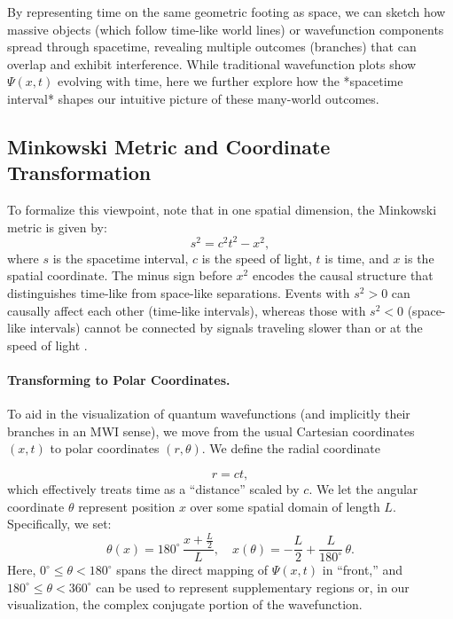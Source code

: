 \documentclass{article}
\begin{document}
By representing time on the same geometric footing as space, we can sketch how massive objects (which follow time-like world lines) or wavefunction components spread through spacetime, revealing multiple outcomes (branches) that can overlap and exhibit interference. While traditional wavefunction plots show \(\Psi(x,t)\) evolving with time, here we further explore how the *spacetime interval* shapes our intuitive picture of these many-world outcomes.

\subsection{Minkowski Metric and Coordinate Transformation}

To formalize this viewpoint, note that in one spatial dimension, the Minkowski metric is given by:
\begin{equation}
s^2 = c^2 t^2 - x^2,
\label{eq:minkowski}
\end{equation}
where \(s\) is the spacetime interval, \(c\) is the speed of light, \(t\) is time, and \(x\) is the spatial coordinate. The minus sign before \(x^2\) encodes the causal structure that distinguishes time-like from space-like separations. Events with \(s^2 > 0\) can causally affect each other (time-like intervals), whereas those with \(s^2 < 0\) (space-like intervals) cannot be connected by signals traveling slower than or at the speed of light \cite{rindler1977essential}.

\paragraph{Transforming to Polar Coordinates.}
To aid in the visualization of quantum wavefunctions (and implicitly their branches in an MWI sense), we move from the usual Cartesian coordinates \((x, t)\) to polar coordinates \((r, \theta)\). We define the radial coordinate

\begin{equation}
r = c t,
\end{equation}
which effectively treats time as a “distance” scaled by \(c\). We let the angular coordinate \(\theta\) represent position \(x\) over some spatial domain of length \(L\). Specifically, we set:
\begin{equation}
\theta(x) = 180^\circ \,\frac{x + \tfrac{L}{2}}{L}, 
\quad 
x(\theta) = -\frac{L}{2} + \frac{L}{180^\circ}\,\theta.
\label{eq:theta_transform}
\end{equation}
Here, \(0^\circ \le \theta < 180^\circ\) spans the direct mapping of \(\Psi(x,t)\) in “front,” and \(180^\circ \le \theta < 360^\circ\) can be used to represent supplementary regions or, in our visualization, the complex conjugate portion of the wavefunction.
\end{document}
